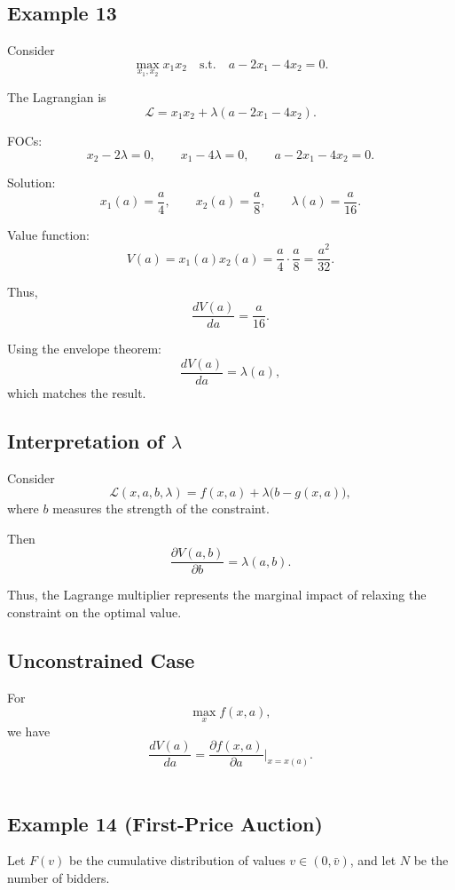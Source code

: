 \subsection*{Example 13}

Consider
\[
\max_{x_1,x_2} x_1 x_2
\quad \text{s.t.} \quad a - 2x_1 - 4x_2 = 0.
\]

The Lagrangian is
\[
\mathcal{L}
=
x_1 x_2 + \lambda (a - 2x_1 - 4x_2).
\]

FOCs:
\[
x_2 - 2\lambda = 0,
\qquad
x_1 - 4\lambda = 0,
\qquad
a - 2x_1 - 4x_2 = 0.
\]

Solution:
\[
x_1(a) = \frac{a}{4},
\qquad
x_2(a) = \frac{a}{8},
\qquad
\lambda(a) = \frac{a}{16}.
\]

Value function:
\[
V(a)
=
x_1(a)x_2(a)
=
\frac{a}{4}\cdot \frac{a}{8}
=
\frac{a^2}{32}.
\]

Thus,
\[
\frac{dV(a)}{da} = \frac{a}{16}.
\]

Using the envelope theorem:
\[
\frac{dV(a)}{da} = \lambda(a),
\]
which matches the result.

\subsection*{Interpretation of $\lambda$}

Consider
\[
\mathcal{L}(x,a,b,\lambda)=f(x,a)+\lambda\bigl(b-g(x,a)\bigr),
\]
where $b$ measures the strength of the constraint.

Then
\[
\frac{\partial V(a,b)}{\partial b}
=
\lambda(a,b).
\]

Thus, the Lagrange multiplier represents the marginal impact of relaxing
the constraint on the optimal value.

\subsection*{Unconstrained Case}

For
\[
\max_x f(x,a),
\]
we have
\[
\frac{dV(a)}{da}
=
\frac{\partial f(x,a)}{\partial a}\Big|_{x=x(a)}.
\]\\




\subsection*{Example 14 (First-Price Auction)}

Let $F(v)$ be the cumulative distribution of values $v \in (0,\bar v)$,
and let $N$ be the number of bidders.

